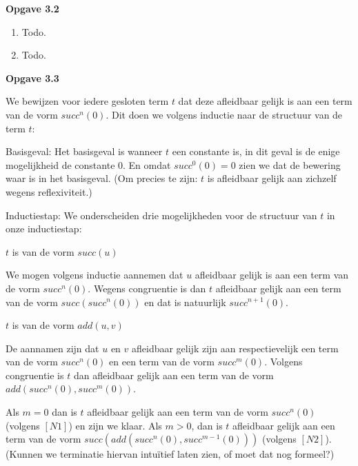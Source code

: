 \documentclass[a4paper,11pt]{article}
\begin{document}
{\bf Opgave 3.2}

\begin{enumerate}

\item %
Todo.

\item %
Todo.

\end{enumerate}


{\bf Opgave 3.3}

We bewijzen voor iedere gesloten term $t$ dat deze afleidbaar gelijk is aan
een term van de vorm $succ^{n}(0)$. Dit doen we volgens inductie naar de
structuur van de term $t$:

\begin{description}

\item{Basisgeval:}
  Het basisgeval is wanneer $t$ een constante is, in dit geval is de enige
  mogelijkheid de constante $0$. En omdat $succ^0(0) = 0$ zien we dat de
  bewering waar is in het basisgeval. (Om precies te zijn: $t$ is afleidbaar
  gelijk aan zichzelf wegens reflexiviteit.)

\item{Inductiestap:}
  We onderscheiden drie mogelijkheden voor de structuur van $t$ in onze
  inductiestap:

  \begin{description}

  \item{$t$ is van de vorm $succ(u)$}

    We mogen volgens inductie aannemen dat $u$ afleidbaar gelijk is aan een
    term van de vorm $succ^{n}(0)$. Wegens congruentie is dan $t$ afleidbaar
    gelijk aan een term van de vorm $succ(succ^{n}(0))$ en dat is natuurlijk
    $succ^{n+1}(0)$.

  \item{$t$ is van de vorm $add(u, v)$}

    De aannamen zijn dat $u$ en $v$ afleidbaar gelijk zijn aan respectievelijk
    een term van de vorm $succ^{n}(0)$ en een term van de vorm
    $succ^{m}(0)$. Volgens congruentie is $t$ dan afleidbaar gelijk aan een
    term van de vorm $add(succ^{n}(0), succ^{m}(0))$.

    Als $m = 0$ dan is $t$ afleidbaar gelijk aan een term van de vorm
    $succ^{n}(0)$ (volgens $[N1]$) en zijn we klaar. Als $m > 0$, dan is $t$
    afleidbaar gelijk aan een term van de vorm $succ(add(succ^{n}(0),
    succ^{m-1}(0)))$ (volgens $[N2]$). (Kunnen we terminatie hiervan
    intu\"itief laten zien, of moet dat nog formeel?)


\end{description}
\end{description}
\end{document}
